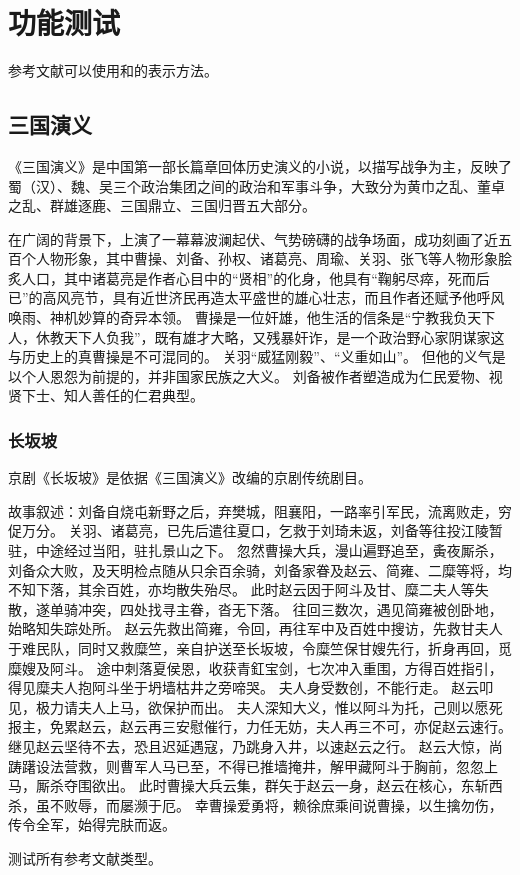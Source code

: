
\chapter{功能测试}

参考文献可以使用\cite{BUPT_Thesis_Format_2014}和\parencite{BUPT_Thesis_Format_2004}的表示方法。

\section{三国演义}
《三国演义》\cite{SANGUOYANYI}是中国第一部长篇章回体历史演义的小说，以描写战争为主，反映了蜀（汉）、魏、吴三个政治集团之间的政治和军事斗争，大致分为黄巾之乱、董卓之乱、群雄逐鹿、三国鼎立、三国归晋五大部分。

在广阔的背景下，上演了一幕幕波澜起伏、气势磅礴的战争场面，成功刻画了近五百个人物形象，其中曹操、刘备、孙权、诸葛亮、周瑜、关羽、张飞等人物形象脍炙人口，其中诸葛亮是作者心目中的“贤相”的化身，他具有“鞠躬尽瘁，死而后已”的高风亮节，具有近世济民再造太平盛世的雄心壮志，而且作者还赋予他呼风唤雨、神机妙算的奇异本领。
曹操是一位奸雄，他生活的信条是“宁教我负天下人，休教天下人负我”，既有雄才大略，又残暴奸诈，是一个政治野心家阴谋家这与历史上的真曹操是不可混同的。
关羽“威猛刚毅”、“义重如山”。
但他的义气是以个人恩怨为前提的，并非国家民族之大义。
刘备被作者塑造成为仁民爱物、视贤下士、知人善任的仁君典型。

\subsection{长坂坡}
京剧《长坂坡》\cite{CHANGBANPO}是依据《三国演义》改编的京剧传统剧目。

故事叙述：刘备自烧屯新野之后，弃樊城，阻襄阳，一路率引军民，流离败走，穷促万分。
关羽、诸葛亮，已先后遣往夏口，乞救于刘琦未返，刘备等往投江陵暂驻，中途经过当阳，驻扎景山之下。
忽然曹操大兵，漫山遍野追至，夤夜厮杀，刘备众大败，及天明检点随从只余百余骑，刘备家眷及赵云、简雍、二糜等将，均不知下落，其余百姓，亦均散失殆尽。
此时赵云因于阿斗及甘、糜二夫人等失散，遂单骑冲突，四处找寻主眷，沓无下落。
往回三数次，遇见简雍被创卧地，始略知失踪处所。
赵云先救出简雍，令回，再往军中及百姓中搜访，先救甘夫人于难民队，同时又救糜竺，亲自护送至长坂坡，令糜竺保甘嫂先行，折身再回，觅糜嫂及阿斗。
途中刺落夏侯恩，收获青釭宝剑，七次冲入重围，方得百姓指引，得见糜夫人抱阿斗坐于坍墙枯井之旁啼哭。
夫人身受数创，不能行走。
赵云叩见，极力请夫人上马，欲保护而出。
夫人深知大义，惟以阿斗为托，己则以愿死报主，免累赵云，赵云再三安慰催行，力任无妨，夫人再三不可，亦促赵云速行。
继见赵云坚待不去，恐且迟延遇寇，乃跳身入井，以速赵云之行。
赵云大惊，尚踌躇设法营救，则曹军人马已至，不得已推墙掩井，解甲藏阿斗于胸前，忽忽上马，厮杀夺围欲出。
此时曹操大兵云集，群矢于赵云一身，赵云在核心，东斩西杀，虽不败辱，而屡濒于厄。
幸曹操爱勇将，赖徐庶乘间说曹操，以生擒勿伤，传令全军，始得完肤而返。

测试所有参考文献类型\cite{CITATION_BOOK,CITATION_ARTICLE,CITATION_PROCEEDINGS,CITATION_INPROCEEDINGS,CITATION_TECHREPORT,CITATION_STANDARD,CITATION_PATENT,CITATION_NEWSPAPER,CITATION_ELECTRONIC}。

\chapterbib

